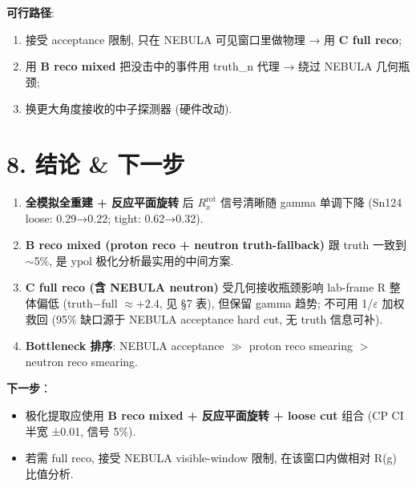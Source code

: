 \documentclass[a4paper,11pt]{article}
\begin{document}
\textbf{可行路径}:
\begin{enumerate}[nosep]
\item 接受 acceptance 限制, 只在 NEBULA 可见窗口里做物理 → 用 \textbf{C full reco};
\item 用 \textbf{B reco mixed} 把没击中的事件用 truth\_n 代理 → 绕过 NEBULA 几何瓶颈;
\item 换更大角度接收的中子探测器 (硬件改动).
\end{enumerate}
\section{8. 结论 \& 下一步}

\begin{enumerate}[nosep]
\item \textbf{全模拟全重建 + 反应平面旋转} 后 $R_x^\text{rot}$ 信号清晰随 gamma 单调下降 (Sn124 loose: 0.29→0.22; tight: 0.62→0.32).
\item \textbf{B reco mixed (proton reco + neutron truth-fallback)} 跟 truth 一致到 $\sim$5\%, 是 ypol 极化分析最实用的中间方案.
\item \textbf{C full reco (含 NEBULA neutron)} 受几何接收瓶颈影响 lab-frame R 整体偏低 (truth−full $\approx +2.4$, 见 §7 表), 但保留 gamma 趋势; 不可用 1/$\varepsilon$ 加权救回 (95\% 缺口源于 NEBULA acceptance hard cut, 无 truth 信息可补).
\item \textbf{Bottleneck 排序}: NEBULA acceptance $\gg$ proton reco smearing $>$ neutron reco smearing.
\end{enumerate}

\textbf{下一步}：
\begin{itemize}[nosep]
\item 极化提取应使用 \textbf{B reco mixed + 反应平面旋转 + loose cut} 组合 (CP CI 半宽 ±0.01, 信号 5\%).
\item 若需 full reco, 接受 NEBULA visible-window 限制, 在该窗口内做相对 R(g) 比值分析.
\end{itemize}
\end{document}
